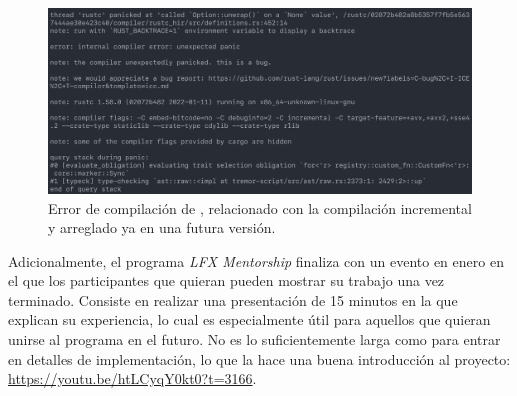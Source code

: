 \begin{figure}[H]
    \centering
    \includegraphics[width=\textwidth]{./Imagenes/rustc_crash.png}
    \caption{Error de compilación de , relacionado con la
    compilación incremental y arreglado ya en una futura
    versión.}%
    \label{fig:rustc_crash}
\end{figure}

Adicionalmente, el programa \emph{LFX Mentorship} finaliza con un evento en
enero en el que los participantes que quieran pueden mostrar su trabajo una vez
terminado. Consiste en realizar una presentación de 15 minutos en la que
explican su experiencia, lo cual es especialmente útil para aquellos que quieran
unirse al programa en el futuro. No es lo suficientemente larga como para entrar
en detalles de implementación, lo que la hace una buena introducción al
proyecto: \url{https://youtu.be/htLCyqY0kt0?t=3166}.
